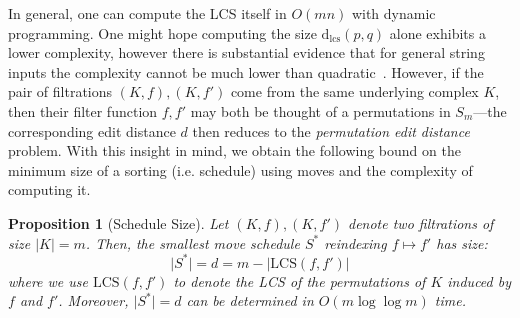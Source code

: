 \documentclass[sn-mathphys]{sn-jnl}
\newtheorem{proposition}{Proposition}
\begin{document}
%
In general, one can compute the LCS itself in $O(mn)$  with dynamic programming. One might hope computing the size $\mathrm{d}_{\mathrm{lcs}}(p,q)$ alone exhibits a lower complexity, however there is substantial evidence that for general string inputs the complexity cannot be much lower than quadratic~\cite{abboud2015tight}. 
However, if the pair of filtrations $(K, f), (K, f')$ come from the same underlying complex $K$, then their filter function $f, f'$ may both be thought of a permutations in $S_m$---the corresponding edit distance $d$ then reduces to the \emph{permutation edit distance} problem.
With this insight in mind, we obtain the following bound on the minimum size of a sorting (i.e. schedule) using moves and the complexity of computing it. 
\begin{proposition}[Schedule Size]\label{prop:schedule_size}
Let $(K, f), (K, f')$ denote two filtrations of size $\lvert K \rvert = m$. Then, the smallest move schedule $S^*$ reindexing $f \mapsto f'$ has size: 
$$ \lvert S^\ast \rvert = d = m - \lvert \mathrm{LCS}(f, f') \rvert $$ 
where we use $\mathrm{LCS}(f, f')$ to denote the LCS of the permutations of $K$ induced by $f$ and $f'$.
Moreover, $\lvert S^\ast \rvert = d$ can be determined in $O(m \log \log m)$ time. 
\end{proposition}
\end{document}
